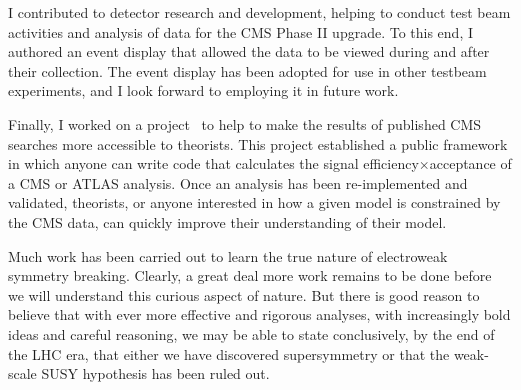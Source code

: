 I contributed to detector research and development, helping to conduct test beam activities and analysis of data for the CMS Phase II upgrade. To this end, I authored an event display that allowed the data to be viewed during and after their collection. The event display has been adopted for use in other testbeam experiments, and I look forward to employing it in future work.

Finally, I worked on a project~\cite{Dumont:2014tja} to help to make the results of published CMS searches more accessible to theorists. This project established a public framework in which anyone can write code that calculates the signal efficiency$\times$acceptance of a CMS or ATLAS analysis.  Once an analysis has been re-implemented and validated, theorists, or anyone interested in how a given model is constrained by the CMS data, can quickly improve their understanding of their model.

Much work has been carried out to learn the true nature of electroweak symmetry breaking. Clearly, a great deal more work remains to be done before we will understand this curious aspect of nature. But there is good reason to believe that with ever more effective and rigorous analyses, with increasingly bold ideas and careful reasoning, we may be able to state conclusively, by the end of the LHC era, that either we have discovered supersymmetry or that the weak-scale SUSY hypothesis has been ruled out.

